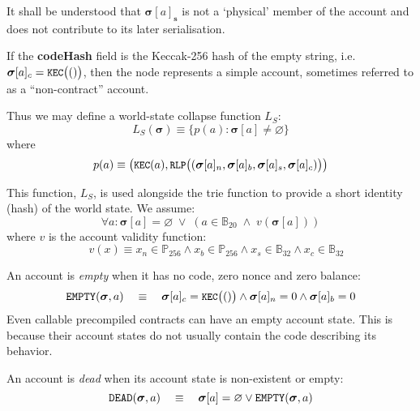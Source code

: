 \documentclass[9pt,oneside]{amsart}
\begin{document}
\begin{multicols}{2}
It shall be understood that $\boldsymbol{\sigma}[a]_\mathbf{s}$ is not a `physical' member of the account and does not contribute to its later serialisation.

If the \textbf{codeHash} field is the Keccak-256 hash of the empty string, i.e. $\boldsymbol{\sigma}[a]_c = \texttt{\small KEC}\big(()\big)$, then the node represents a simple account, sometimes referred to as a ``non-contract'' account.

Thus we may define a world-state collapse function $L_S$:
\begin{equation}
L_S(\boldsymbol{\sigma}) \equiv \{ p(a): \boldsymbol{\sigma}[a] \neq \varnothing \}
\end{equation}
where
\begin{equation}
p(a) \equiv  \big(\texttt{\small KEC}(a), \texttt{\small RLP}\big( (\boldsymbol{\sigma}[a]_n, \boldsymbol{\sigma}[a]_b, \boldsymbol{\sigma}[a]_s, \boldsymbol{\sigma}[a]_c) \big) \big)
\end{equation}

This function, $L_S$, is used alongside the trie function to provide a short identity (hash) of the world state. We assume:
\begin{equation}
\forall a: \boldsymbol{\sigma}[a] = \varnothing \; \vee \; (a \in \mathbb{B}_{20} \; \wedge \; v(\boldsymbol{\sigma}[a]))
\end{equation}
where $v$ is the account validity function:
\begin{equation}
\quad v(x) \equiv x_n \in \mathbb{P}_{256} \wedge x_b \in \mathbb{P}_{256} \wedge x_s \in \mathbb{B}_{32} \wedge x_c \in \mathbb{B}_{32}
\end{equation}

An account is \textit{empty} when it has no code, zero nonce and zero balance:
\begin{equation}
\mathtt{\tiny EMPTY}(\boldsymbol{\sigma}, a) \quad\equiv\quad \boldsymbol{\sigma}[a]_c = \texttt{\small KEC}\big(()\big) \wedge \boldsymbol{\sigma}[a]_n = 0 \wedge \boldsymbol{\sigma}[a]_b = 0
\end{equation}
Even callable precompiled contracts can have an empty account state. This is because their account states do not usually contain the code describing its behavior.

An account is \textit{dead} when its account state is non-existent or empty:
\begin{equation}
\mathtt{\tiny DEAD}(\boldsymbol{\sigma}, a) \quad\equiv\quad \boldsymbol{\sigma}[a] = \varnothing \vee \mathtt{\tiny EMPTY}(\boldsymbol{\sigma}, a)
\end{equation}


\end{multicols}
\end{document}
